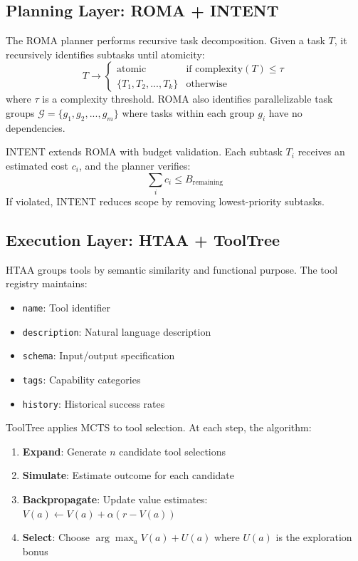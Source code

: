 \documentclass{article}
\begin{document}
\subsection{Planning Layer: ROMA + INTENT}

The ROMA planner performs recursive task decomposition. Given a task $T$, it recursively identifies subtasks until atomicity:
\begin{equation}
T \rightarrow \begin{cases}
\text{atomic} & \text{if } \text{complexity}(T) \leq \tau \\
\{T_1, T_2, ..., T_k\} & \text{otherwise}
\end{cases}
\end{equation}
where $\tau$ is a complexity threshold. ROMA also identifies parallelizable task groups $\mathcal{G} = \{g_1, g_2, ..., g_m\}$ where tasks within each group $g_i$ have no dependencies.

INTENT extends ROMA with budget validation. Each subtask $T_i$ receives an estimated cost $c_i$, and the planner verifies:
\begin{equation}
\sum_{i} c_i \leq B_{\text{remaining}}
\end{equation}
If violated, INTENT reduces scope by removing lowest-priority subtasks.

\subsection{Execution Layer: HTAA + ToolTree}

HTAA groups tools by semantic similarity and functional purpose. The tool registry maintains:
\begin{itemize}
    \item \texttt{name}: Tool identifier
    \item \texttt{description}: Natural language description
    \item \texttt{schema}: Input/output specification
    \item \texttt{tags}: Capability categories
    \item \texttt{history}: Historical success rates
\end{itemize}

ToolTree applies MCTS to tool selection. At each step, the algorithm:
\begin{enumerate}
    \item \textbf{Expand}: Generate $n$ candidate tool selections
    \item \textbf{Simulate}: Estimate outcome for each candidate
    \item \textbf{Backpropagate}: Update value estimates: $V(a) \leftarrow V(a) + \alpha(r - V(a))$
    \item \textbf{Select}: Choose $\arg\max_a V(a) + U(a)$ where $U(a)$ is the exploration bonus
\end{enumerate}
\end{document}
